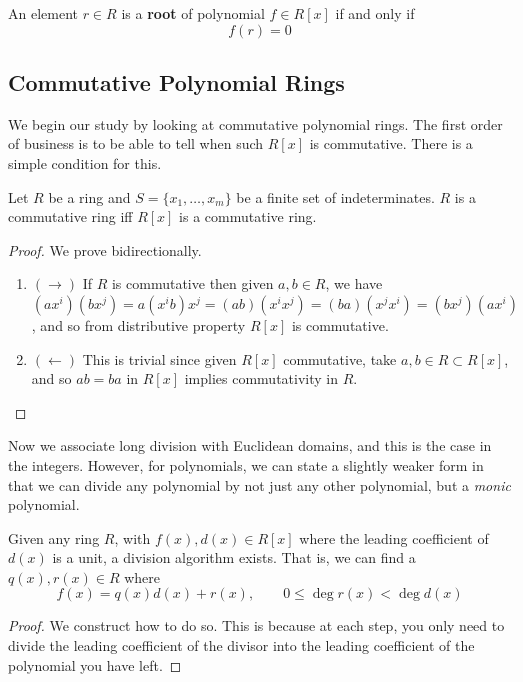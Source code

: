   \begin{definition}
    An element $r \in R$ is a \textbf{root} of polynomial $f \in R[x]$ if and only if 
    \begin{equation}
      f(r) = 0
    \end{equation}
  \end{definition}

\subsection{Commutative Polynomial Rings}

  We begin our study by looking at commutative polynomial rings. The first order of business is to be able to tell when such $R[x]$ is commutative. There is a simple condition for this. 

  \begin{theorem}
    Let $R$ be a ring and $S = \{x_1, \ldots, x_m\}$ be a finite set of indeterminates. $R$ is a commutative ring iff $R[x]$ is a commutative ring. 
  \end{theorem}
  \begin{proof}
    We prove bidirectionally. 
    \begin{enumerate}
      \item $(\rightarrow)$ If $R$ is commutative then given $a, b \in R$, we have $(ax^i) (b x^j) = a (x^i b) x^j = (ab)(x^i x^j) = (ba) (x^j x^i) = (b x^j) (a x^i)$, and so from distributive property $R[x]$ is commutative. 
      \item $(\leftarrow)$ This is trivial since given $R[x]$ commutative, take $a, b \in R \subset R[x]$, and so $ab = ba$ in $R[x]$ implies commutativity in $R$. 
    \end{enumerate}
  \end{proof}

  Now we associate long division with Euclidean domains, and this is the case in the integers. However, for polynomials, we can state a slightly weaker form in that we can divide any polynomial by not just any other polynomial, but a \textit{monic} polynomial. 

  \begin{theorem}
    \label{thm:poly-long-division}
    Given any ring $R$, with $f(x), d(x) \in R[x]$ where the leading coefficient of $d(x)$ is a unit, a division algorithm exists. That is, we can find a $q(x), r(x) \in R$ where 
    \begin{equation}
      f(x) = q(x) d(x) + r(x), \qquad 0 \leq \deg{r(x)} < \deg{d(x)}
    \end{equation}
  \end{theorem}
  \begin{proof}
    We construct how to do so. This is because at each step, you only need to divide the leading coefficient of the divisor into the leading coefficient of the polynomial you have left. 
  \end{proof}

